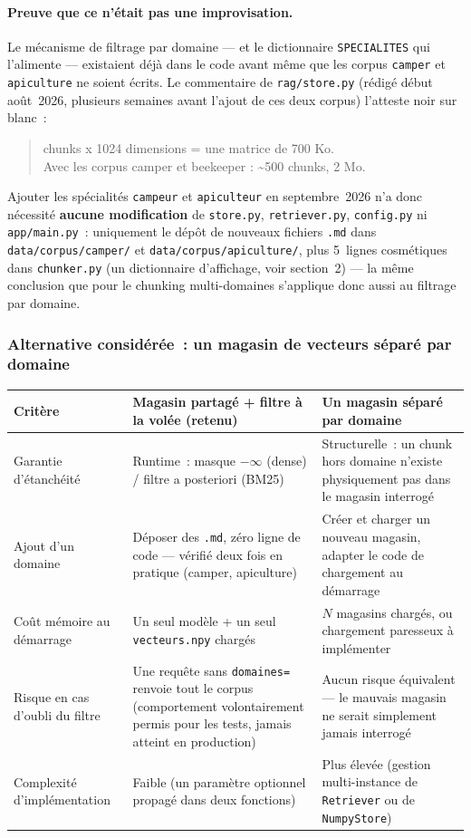 \documentclass[11pt]{article}
\begin{document}
\paragraph{Preuve que ce n'était pas une improvisation.}
Le mécanisme de filtrage par domaine --- et le dictionnaire \texttt{SPECIALITES} qui l'alimente ---
existaient déjà dans le code avant même que les corpus \texttt{camper} et \texttt{apiculture} ne
soient écrits. Le commentaire de \texttt{rag/store.py} (rédigé début août~2026, plusieurs semaines
avant l'ajout de ces deux corpus) l'atteste noir sur blanc~:

\begin{quote}
 chunks x 1024 dimensions = une matrice de 700 Ko.\\
Avec les corpus camper et beekeeper : \textasciitilde500 chunks, 2 Mo.
\end{quote}

Ajouter les spécialités \texttt{campeur} et \texttt{apiculteur} en septembre~2026 n'a donc
nécessité \textbf{aucune modification} de \texttt{store.py}, \texttt{retriever.py},
\texttt{config.py} ni \texttt{app/main.py}~: uniquement le dépôt de nouveaux fichiers \texttt{.md}
dans \texttt{data/corpus/camper/} et \texttt{data/corpus/apiculture/}, plus 5~lignes cosmétiques
dans \texttt{chunker.py} (un dictionnaire d'affichage, voir section~2) --- la même conclusion que
pour le chunking multi-domaines s'applique donc aussi au filtrage par domaine.

\subsubsection*{Alternative considérée~: un magasin de vecteurs séparé par domaine}

\begin{tabularx}{\textwidth}{@{}l Y Y@{}}
\toprule
\textbf{Critère} & \textbf{Magasin partagé + filtre à la volée (retenu)} & \textbf{Un magasin séparé par domaine} \\
\midrule
Garantie d'étanchéité & Runtime~: masque $-\infty$ (dense) / filtre a posteriori (BM25) & Structurelle~: un chunk hors domaine n'existe physiquement pas dans le magasin interrogé \\
Ajout d'un domaine & Déposer des \texttt{.md}, zéro ligne de code --- vérifié deux fois en pratique (camper, apiculture) & Créer et charger un nouveau magasin, adapter le code de chargement au démarrage \\
Coût mémoire au démarrage & Un seul modèle + un seul \texttt{vecteurs.npy} chargés & $N$ magasins chargés, ou chargement paresseux à implémenter \\
Risque en cas d'oubli du filtre & Une requête sans \texttt{domaines=} renvoie tout le corpus (comportement volontairement permis pour les tests, jamais atteint en production) & Aucun risque équivalent --- le mauvais magasin ne serait simplement jamais interrogé \\
Complexité d'implémentation & Faible (un paramètre optionnel propagé dans deux fonctions) & Plus élevée (gestion multi-instance de \texttt{Retriever} ou de \texttt{NumpyStore}) \\
\bottomrule
\end{tabularx}
\end{document}
